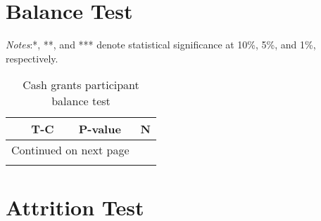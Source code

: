 \documentclass[10pt,a4paper]{article}
\begin{document}
\listoftables

\pagebreak

\section{Balance Test}


\begin{center}
	{\tiny \tabcolsep=1pt  %
		\begin{ThreePartTable}
			\begin{TableNotes}[flushleft]
				\tiny
				\item \textit{Notes}:*, **, and *** denote statistical significance at 10\%, 5\%, and 1\%, respectively.
			\end{TableNotes}
			\begin{longtable}{l*{3}{c}}
				\caption{Cash grants participant balance test}\label{tab:balance_cash}					\\
				\toprule
				\hline 
				&\multicolumn{1}{p{2cm}}{\centering T-C}
				&\multicolumn{1}{p{2cm}}{\centering P-value}
				&\multicolumn{1}{p{2cm}}{\centering N} \\
				\hline 
				\endfirsthead
				\hline
				\endhead
				\hline
				\multicolumn{3}{r}{{Continued on next page}} \\
				\endfoot
				
				\bottomrule
				\insertTableNotes
				\endlastfoot
				
			\end{longtable}
		\end{ThreePartTable}
	}
\end{center}

\section{Attrition Test}
\end{document}
